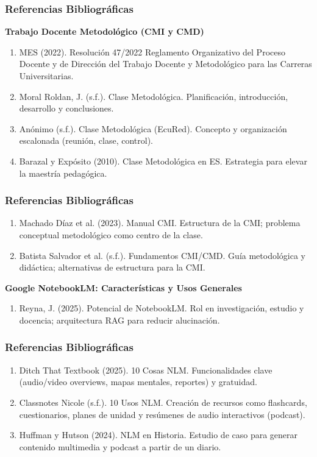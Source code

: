 \documentclass[aspectratio=43]{beamer}
\begin{document}
\begin{frame}
  \frametitle{ Referencias Bibliográficas}
  
  \textbf{Trabajo Docente Metodológico (CMI y CMD)}
  \begin{enumerate}
      \item MES (2022). Resolución 47/2022 Reglamento Organizativo del Proceso Docente y de Dirección del Trabajo Docente y Metodológico para las Carreras Universitarias.
      \item Moral Roldan, J. (s.f.). Clase Metodológica. Planificación, introducción, desarrollo y conclusiones.
      \item Anónimo (s.f.). Clase Metodológica (EcuRed). Concepto y organización escalonada (reunión, clase, control).
      \item Barazal y Expósito (2010). Clase Metodológica en ES. Estrategia para elevar la maestría pedagógica.
  \end{enumerate}
\end{frame}

\begin{frame}
  \frametitle{ Referencias Bibliográficas}
  \begin{enumerate}
      \item Machado Díaz et al. (2023). Manual CMI. Estructura de la CMI; problema conceptual metodológico como centro de la clase.
      \item Batista Salvador et al. (s.f.). Fundamentos CMI/CMD. Guía metodológica y didáctica; alternativas de estructura para la CMI.
  \end{enumerate}
  
  \textbf{Google NotebookLM: Características y Usos Generales}
  \begin{enumerate}    
    \item Reyna, J. (2025). Potencial de NotebookLM. Rol en investigación, estudio y docencia; arquitectura RAG para reducir alucinación.
  \end{enumerate}
\end{frame}

\begin{frame}
  \frametitle{ Referencias Bibliográficas}

  \begin{enumerate}    
    \item Ditch That Textbook (2025). 10 Cosas NLM. Funcionalidades clave (audio/video overviews, mapas mentales, reportes) y gratuidad.
    \item Classnotes Nicole (s.f.). 10 Usos NLM. Creación de recursos como flashcards, cuestionarios, planes de unidad y resúmenes de audio interactivos (podcast).
    \item Huffman y Hutson (2024). NLM en Historia. Estudio de caso para generar contenido multimedia y podcast a partir de un diario.
  \end{enumerate}
\end{frame}
\end{document}

